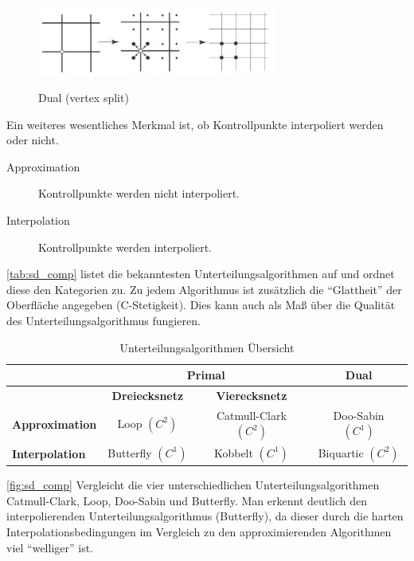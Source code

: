 \begin{figure}
  \caption{Dual (vertex split) \cite{Standford.24.07.2015}}
  \centering
  \includegraphics[width=0.7\textwidth]{content/media/sd_dual}
  \label{fig:sd_dual}
\end{figure}

Ein weiteres wesentliches Merkmal ist, ob Kontrollpunkte interpoliert werden oder nicht. 
\begin{description}
 \item[Approximation] Kontrollpunkte werden nicht interpoliert.
 \item[Interpolation] Kontrollpunkte werden interpoliert.
\end{description}

\autoref{tab:sd_comp} listet die bekanntesten Unterteilungsalgorithmen auf und ordnet diese den Kategorien zu.
Zu jedem Algorithmus ist zusätzlich die \enquote{Glattheit} der Oberfläche angegeben (C-Stetigkeit).
Dies kann auch als Maß über die Qualität des Unterteilungsalgorithmus fungieren.

\begin{table}
\caption{Unterteilungsalgorithmen Übersicht}
\center
\begin{tabular}{l|c|c|c}
& \multicolumn{2}{c|}{\textbf{Primal}} & \textbf{Dual}\\
\hline
& \textbf{Dreiecksnetz} & \textbf{Vierecksnetz} & \\
\hline
\textbf{Approximation} & Loop \((C^2)\) & Catmull-Clark \((C^2)\) & Doo-Sabin \((C^1)\) \\
\textbf{Interpolation} & Butterfly \((C^1)\) & Kobbelt \((C^1)\) & Biquartic \((C^2)\) \\
\end{tabular}
\label{tab:sd_comp}
\end{table}

\autoref{fig:sd_comp} Vergleicht die vier unterschiedlichen Unterteilungsalgorithmen Catmull-Clark, Loop, Doo-Sabin und Butterfly.
Man erkennt deutlich den interpolierenden Unterteilungsalgorithmus (Butterfly),
da dieser durch die harten Interpolationsbedingungen im Vergleich zu den approximierenden Algorithmen viel \enquote{welliger} ist.

